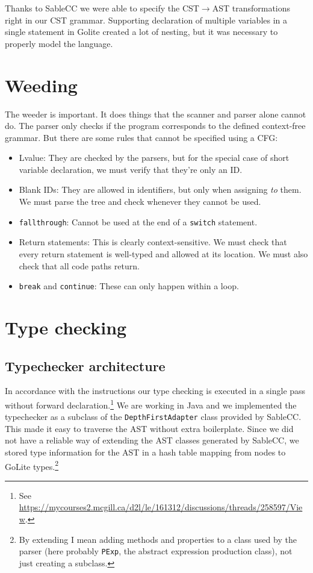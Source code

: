 \documentclass[oneside]{article}
\begin{document}
Thanks to SableCC we were able to specify the CST$\rightarrow$AST transformations right in our CST grammar. Supporting declaration of multiple variables in a single statement in Golite created a lot of nesting, but it was necessary to properly model the language.

\section{Weeding}

The weeder is important. It does things that the scanner and parser alone cannot do. The parser only checks if the program corresponds to the defined context-free grammar. But there are some rules that cannot be specified using a CFG:
\begin{itemize}
\item Lvalue: They are checked by the parsers, but for the special case of short variable declaration, we must verify that they're only an ID.
\item Blank IDs: They are allowed in identifiers, but only when assigning \textit{to} them. We must parse the tree and check whenever they cannot be used.
\item \verb|fallthrough|: Cannot be used at the end of a \verb|switch| statement.
\item Return statements: This is clearly context-sensitive. We must check that every return statement is well-typed and allowed at its location. We must also check that all code paths return.
\item \verb|break| and \verb|continue|: These can only happen within a loop.
\end{itemize}

\section{Type checking}
\subsection{Typechecker architecture}

In accordance with the instructions our type checking is executed in a single pass without forward declaration.\footnote{See \url{https://mycourses2.mcgill.ca/d2l/le/161312/discussions/threads/258597/View}.} We are working in Java and we implemented the typechecker as a subclass of the \verb|DepthFirstAdapter| class provided by SableCC. This made it easy to traverse the AST without extra boilerplate. Since we did not have a reliable way of extending the AST classes generated by SableCC, we stored type information for the AST in a hash table mapping from nodes to GoLite types.\footnote{By extending I mean adding methods and properties to a class used by the parser (here probably \texttt{PExp}, the abstract expression production class), not just creating a subclass.}
\end{document}

